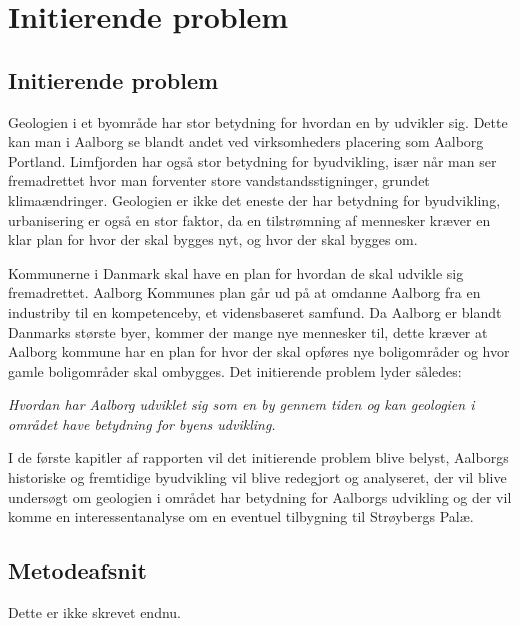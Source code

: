 \chapter{Initierende problem}

\section{Initierende problem}

Geologien i et byområde har stor betydning for hvordan en by udvikler sig. Dette kan man i Aalborg se blandt andet ved virksomheders placering som Aalborg Portland. Limfjorden har også stor betydning for byudvikling, især når man ser fremadrettet hvor man forventer store vandstandsstigninger, grundet klimaændringer. Geologien er ikke det eneste der har betydning for byudvikling, urbanisering er også en stor faktor, da en tilstrømning af mennesker kræver en klar plan for hvor der skal bygges nyt, og hvor der skal bygges om. 


Kommunerne i Danmark skal have en plan for hvordan de skal udvikle sig fremadrettet. Aalborg Kommunes plan går ud på at omdanne Aalborg fra en industriby til en kompetenceby, et vidensbaseret samfund. Da Aalborg er blandt Danmarks største byer, kommer der mange nye mennesker til, dette kræver at Aalborg kommune har en plan for hvor der skal opføres nye boligområder og hvor gamle boligområder skal ombygges. Det initierende problem lyder således:


\textit{Hvordan har Aalborg udviklet sig som en by gennem tiden og kan geologien i området have betydning for byens udvikling.}


I de første kapitler af rapporten vil det initierende problem blive belyst, Aalborgs historiske og fremtidige byudvikling vil blive redegjort og analyseret, der vil blive undersøgt om geologien i området har betydning for Aalborgs udvikling og der vil komme en interessentanalyse om en eventuel tilbygning til Strøybergs Palæ.

\section{Metodeafsnit}
Dette er ikke skrevet endnu.